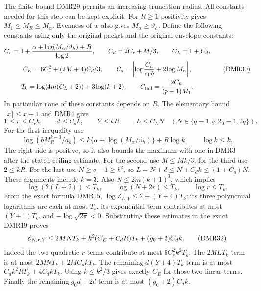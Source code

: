 \documentclass[11pt,a4paper]{article}
\begin{document}
The finite bound DMR29 permits an increasing truncation radius.
All constants needed for this step can be kept explicit.
For $R\geq1$ positivity gives $M_1\leq M_R\leq M_\alpha$.
Evenness of $w$ also gives $M_\alpha\geq\vartheta_h$.
Define the following constants using only the original packet
and the original envelope constants:
\[
 \begin{gathered}
 C_r=1+\frac{\alpha+\log(M_\alpha/\vartheta_h)+B}{\log2},
 \qquad C_d=2C_r+M/3,\qquad C_L=1+C_d,\\
 C_E=6C_r^2+(2M+4)C_d/3,\qquad
 C_s=\left|\log\frac{C_h}{c_\Gamma b}+2\log M_\alpha\right|,\\
 T_k=\log(4m(C_L+2))+3\log(k+2),\qquad
 C_{\rm tail}=\frac{2C_h}{(p-1)M_1}.
 \end{gathered}\tag{DMR30}
\]
In particular none of these constants depends on $R$.
The elementary bound $\lceil x\rceil\leq x+1$ and DMR4 give
\[
 1\leq r\leq C_r k,\qquad
 d\leq C_d k,\qquad Y\leq kR,\qquad L\leq C_L N
 \quad(N\in\{q-1,q,2q-1,2q\}).
 \tag{DMR31}
\]
For the first inequality use
\[
 \log(bM_R^{k-3}/a_k)
 \leq k\{\alpha+\log(M_\alpha/\vartheta_h)\}+B\log k,
 \qquad \log k\leq k.
\]
The right side is positive, so it also bounds the maximum with
one in DMR3 after the stated ceiling estimate. For the second
use $M\leq Mk/3$; for the third use $2\leq kR$.
For the last use $N\geq q-1\geq k^2$, so
$L=N+d\leq N+C_dk\leq(1+C_d)N$.
These arguments include $k=3$.
Also $N\leq2m(k+1)^3$, which implies
\[
 \log(2(L+2))\leq T_k,\qquad
 \log(N+2r)\leq T_k,\qquad \log r\leq T_k .
\]
From the exact formula DMR15,
$\log Z_{L,Y}\leq2+(Y+4)T_k$:
its three polynomial logarithms are each at most $T_k$,
its exponential term contributes at most $(Y+1)T_k$,
and $-\log\sqrt{2\pi}<0$.
Substituting these estimates in the exact DMR19 proves
\[
 {\cal E}_{N,r,Y}
 \leq 2MNT_k+k^2(C_E+C_dR)T_k+(g_0+2)C_dk .
 \tag{DMR32}
\]
Indeed the two quadratic $r$ terms contribute at most
$6C_r^2k^2T_k$. The $2MLT_k$ term is at most
$2MNT_k+2MC_dkT_k$. The remaining $d(Y+4)T_k$ term
is at most $C_dk^2RT_k+4C_dkT_k$.
Using $k\leq k^2/3$ gives exactly $C_E$ for those two
linear terms. Finally the remaining $g_0d+2d$ term
is at most $(g_0+2)C_dk$.
\end{document}
